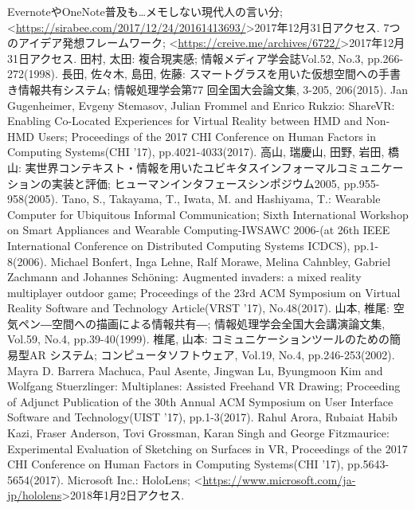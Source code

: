 \documentclass[11pt,a4j, titlepage]{jarticle} %
\begin{document}
\newpage
\begin{thebibliography}{数字}
   EvernoteやOneNote普及も…メモしない現代人の言い分; \textless\url{https://sirabee.com/2017/12/24/20161413693/}\textgreater2017年12月31日アクセス.
   7つのアイデア発想フレームワーク; \textless\url{https://creive.me/archives/6722/}\textgreater2017年12月31日アクセス.
   田村, 太田: 複合現実感; 情報メディア学会誌Vol.52, No.3, pp.266-272(1998).
   長田, 佐々木, 島田, 佐藤: スマートグラスを用いた仮想空間への手書き情報共有システム; 情報処理学会第77 回全国大会論文集, 3-205, 206(2015).
   	Jan Gugenheimer, Evgeny Stemasov, Julian Frommel and Enrico Rukzio: ShareVR: Enabling Co-Located Experiences for Virtual Reality between HMD and Non-HMD Users; Proceedings of the 2017 CHI Conference on Human Factors in Computing Systems(CHI '17), pp.4021-4033(2017).
   高山, 瑞慶山, 田野, 岩田, 橋山: 実世界コンテキスト・情報を用いたユビキタスインフォーマルコミュニケーションの実装と評価; ヒューマンインタフェースシンポジウム2005, pp.955-958(2005).
   Tano, S., Takayama, T., Iwata, M. and Hashiyama, T.: Wearable Computer for Ubiquitous Informal Communication; Sixth International Workshop on Smart Appliances and Wearable Computing-IWSAWC 2006-(at 26th IEEE International Conference on Distributed Computing Systems
ICDCS), pp.1-8(2006).
   Michael Bonfert, Inga Lehne, Ralf Morawe, Melina Cahnbley, Gabriel Zachmann and Johannes Sch\"oning: Augmented invaders: a mixed reality multiplayer outdoor game; Proceedings of the 23rd ACM Symposium on Virtual Reality Software and Technology Article(VRST '17), No.48(2017).
   山本, 椎尾: 空気ペン―空間への描画による情報共有―; 情報処理学会全国大会講演論文集, Vol.59, No.4, pp.39-40(1999).
   椎尾, 山本: コミュニケーションツールのための簡易型AR システム; コンピュータソフトウェア, Vol.19, No.4, pp.246-253(2002).
   Mayra D. Barrera Machuca, Paul Asente, Jingwan Lu, Byungmoon Kim and Wolfgang Stuerzlinger: Multiplanes: Assisted Freehand VR Drawing; Proceeding of Adjunct Publication of the 30th Annual ACM Symposium on User Interface Software and Technology(UIST '17), pp.1-3(2017).
   Rahul Arora, 	Rubaiat Habib Kazi, 	Fraser Anderson, Tovi Grossman, Karan Singh and George Fitzmaurice: Experimental Evaluation of Sketching on Surfaces in VR, Proceedings of the 2017 CHI Conference on Human Factors in Computing Systems(CHI '17), pp.5643-5654(2017).
   Microsoft Inc.: HoloLens; \textless\url{https://www.microsoft.com/ja-jp/hololens}\textgreater2018年1月2日アクセス.

\end{thebibliography}
\end{document}
